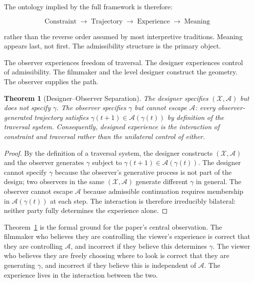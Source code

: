 \documentclass[12pt, a4paper]{article}
\theoremstyle{plain}
\newtheorem{theorem}{Theorem}[section]
\theoremstyle{definition}
\theoremstyle{remark}
\newcommand{\X}{\mathcal{X}}
\newcommand{\A}{\mathcal{A}}
\newcommand{\traj}{\gamma}
\begin{document}
The ontology implied by the full framework is therefore:

\begin{equation}
  \text{Constraint}
  \;\longrightarrow\;
  \text{Trajectory}
  \;\longrightarrow\;
  \text{Experience}
  \;\longrightarrow\;
  \text{Meaning}
\end{equation}

rather than the reverse order assumed by most interpretive
traditions. Meaning appears last, not first. The
admissibility structure is the primary object.

The observer experiences freedom of traversal. The designer
experiences control of admissibility. The filmmaker and the
level designer construct the geometry. The observer supplies
the path.

\begin{theorem}[Designer--Observer Separation]
\label{thm:separation}
  The designer specifies $(\X, \A)$ but does not specify
  $\traj$. The observer specifies $\traj$ but cannot escape
  $\A$: every observer-generated trajectory satisfies
  $\traj(t+1) \in \A(\traj(t))$ by definition of the
  traversal system. Consequently, designed experience is
  the interaction of constraint and traversal rather than
  the unilateral control of either.
\end{theorem}

\begin{proof}
  By the definition of a traversal system, the designer
  constructs $(\X, \A)$ and the observer generates $\traj$
  subject to $\traj(t+1) \in \A(\traj(t))$. The designer
  cannot specify $\traj$ because the observer's generative
  process is not part of the design; two observers in the
  same $(\X, \A)$ generate different $\traj$ in general.
  The observer cannot escape $\A$ because admissible
  continuation requires membership in $\A(\traj(t))$ at
  each step. The interaction is therefore irreducibly
  bilateral: neither party fully determines the experience
  alone.
\end{proof}

Theorem~\ref{thm:separation} is the formal ground for the
paper's central observation. The filmmaker who believes they
are controlling the viewer's experience is correct that they
are controlling $\A$, and incorrect if they believe this
determines $\traj$. The viewer who believes they are freely
choosing where to look is correct that they are generating
$\traj$, and incorrect if they believe this is independent
of $\A$. The experience lives in the interaction between the
two.
\end{document}

